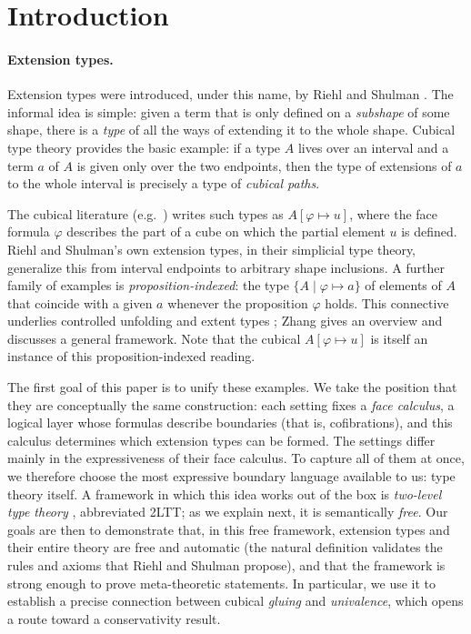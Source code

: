 \begin{longversion}
\tableofcontents
\end{longversion}



\section{Introduction}

\paragraph{Extension types.}
Extension types were introduced, under this name, by Riehl and Shulman
\citep[\S2.2]{RS2017}. The informal idea is simple: given a term that is only
defined on a \emph{subshape} of some shape, there is a \emph{type} of all the
ways of extending it to the whole shape. Cubical type theory provides the
basic example: if a type $A$ lives over an interval and a term $a$ of $A$ is
given only over the two endpoints, then the type of extensions of $a$ to the
whole interval is precisely a type of \emph{cubical paths}.

The cubical literature
(e.g.\ \citep{CCHM2018}) writes such types as $A[\varphi \mapsto u]$, where the face
formula $\varphi$ describes the part of a cube on which the partial element
$u$ is defined. Riehl and Shulman's own extension types, in their simplicial
type theory, generalize this from interval endpoints to arbitrary shape
inclusions. A further family of examples is \emph{proposition-indexed}: the
type $\{A \mid \varphi \mapsto a\}$ of elements of $A$ that coincide with a
given $a$ whenever the proposition $\varphi$ holds. This connective underlies
controlled unfolding \citep{gratzer2022controlling} and extent types
\citep{sterling2022first,sterling2021logical}; Zhang \citep{zhang2023three}
gives an overview and discusses a general framework. Note that the cubical
$A[\varphi\mapsto u]$ is itself an instance of this proposition-indexed
reading.

The first goal of this paper is to unify these examples. We take the position
that they are conceptually the same construction: each setting fixes a
\emph{face calculus}, a logical layer whose formulas describe boundaries
(that is, cofibrations), and this calculus determines which extension types
can be formed. The settings differ mainly in the expressiveness of their face
calculus. To capture all of them at once, we therefore choose the most
expressive boundary language available to us: type theory itself. A framework in
which this idea works out of the box is \emph{two-level type theory}
\citep{AltenkirchCapriottiKraus2016,2LTT}, abbreviated 2LTT; as we explain next, it is
semantically \emph{free}. Our goals are then to demonstrate that, in this free
framework, extension types and their entire theory are free and automatic
(the natural definition validates the rules and axioms that Riehl and Shulman
propose), and that the framework is strong enough to prove meta-theoretic
statements. In particular, we use it to establish a precise connection
between cubical \emph{gluing} and \emph{univalence}, which opens a route
toward a conservativity result.

